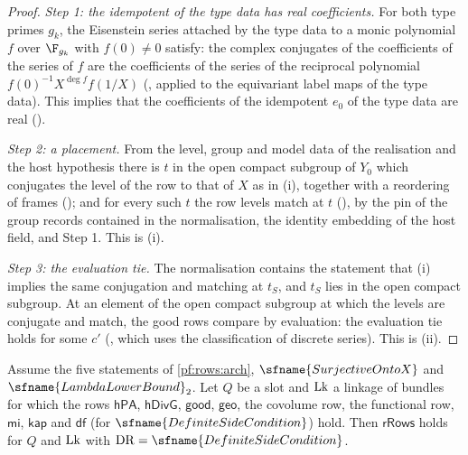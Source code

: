 \begin{proof}
\emph{Step 1: the idempotent of the type data has real coefficients.} For both type primes $g_k$, the Eisenstein series
attached by the type data to a monic polynomial $f$ over $\F_{g_k}$ with $f(0)\ne0$ satisfy: the complex conjugates of the
coefficients of the series of $f$ are the coefficients of the series of the reciprocal polynomial $f(0)^{-1}X^{\deg f}f(1/X)$
(, applied to the equivariant label maps of the type
data). This implies that the coefficients of the idempotent $e_0$ of the type data are real
().

\emph{Step 2: a placement.} From the level, group and model data of the realisation and the host hypothesis there is $t$ in the
open compact subgroup of $Y_0$ which conjugates the level of the row to that of $X$ as in (i), together with a reordering of
frames (); and for every such $t$ the row levels match
at $t$ (), by the pin of the group records contained in the
normalisation, the identity embedding of the host field, and Step 1. This is (i).

\emph{Step 3: the evaluation tie.} The normalisation contains the statement that (i) implies the same conjugation and matching
at $t_S$, and $t_S$ lies in the open compact subgroup. At an element of the open compact subgroup at which the levels are
conjugate and match, the good rows compare by evaluation: the evaluation tie holds for some $c'$
(, which uses the classification of discrete series).
This is (ii).
\end{proof}

\begin{theorem}\label{pf:rows:rrows}
Assume the five statements of \cref{pf:rows:arch}, $\sfname{SurjectiveOntoX}$ and $\sfname{LambdaLowerBound}_2$. Let $Q$ be a
slot and $\mathrm{Lk}$ a linkage of bundles for which the rows $\mathsf{hPA}$, $\mathsf{hDivG}$, $\mathsf{good}$, $\mathsf{geo}$, the
covolume row, the functional row, $\mathsf{mi}$, $\mathsf{kap}$ and $\mathsf{df}$ (for $\sfname{DefiniteSideCondition}$) hold. Then
$\mathsf{rRows}$ holds for $Q$ and $\mathrm{Lk}$ with $\mathrm{DR}=\sfname{DefiniteSideCondition}$.
\end{theorem}

